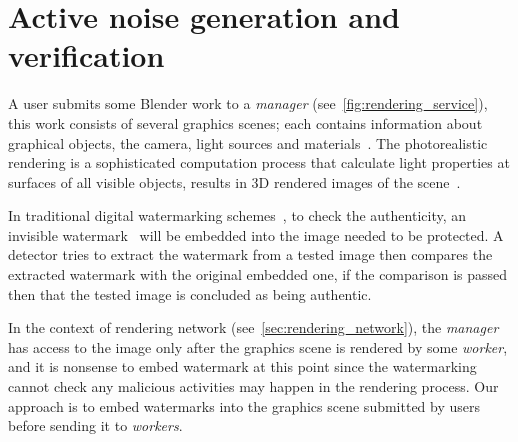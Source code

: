 
\section[Active noise generation and verification]{Active noise generation and verification}
A user submits some Blender work to a \emph{manager} (see~\autoref{fig:rendering_service}), this work consists of several graphics scenes; each contains information about graphical objects, the camera, light sources and materials~\cite{Blender}. The photorealistic rendering is a sophisticated computation process that calculate light properties at surfaces of all visible objects, results in 3D rendered images of the scene~\cite{Hughes2014}.

In traditional digital watermarking schemes~\cite{Cox2008,Cox1997,Cox1999}, to check the authenticity, an invisible watermark~\cite{Craver1997} will be embedded into the image needed to be protected. A detector tries to extract the watermark from a tested image then compares the extracted watermark with the original embedded one, if the comparison is passed then that the tested image is concluded as being authentic.

In the context of rendering network (see~\autoref{sec:rendering_network}), the \emph{manager} has access to the image only after the graphics scene is rendered by some \emph{worker}, and it is nonsense to embed watermark at this point since the watermarking cannot check any malicious activities may happen in the rendering process. Our approach is to embed watermarks into the graphics scene submitted by users before sending it to \emph{workers}.



